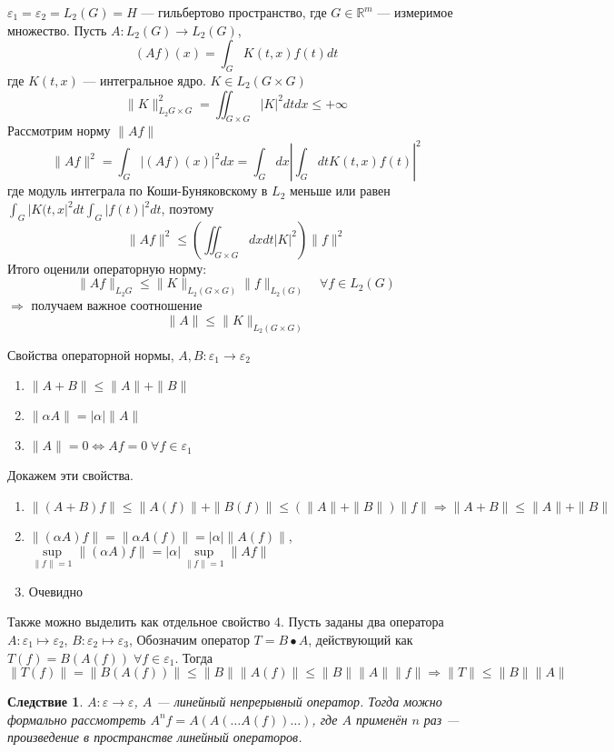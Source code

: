 \documentclass[12pt]{article}
\begin{document}
\begin{Prim}
    $\varepsilon_1 = \varepsilon_2 = L_2(G) = H$ --- гильбертово пространство, где $G \in \mathbb R^m$ --- измеримое множество.
    Пусть $A : L_2(G) \to L_2(G)$, 
    $$
    (Af)(x) = \int_G K(t, x) f(t) dt
    $$
    где $K(t, x)$ --- интегральное ядро.
    $K \in L_2(G \times G) $ 
    $$
    \|K\|^2_{L_2{G \times G}} = \iint_{G \times G} |K|^2 dt dx \le +\infty
    $$
    Рассмотрим норму $\|Af\|$
    $$
    \|Af\|^2 = \int_{G} |(Af)(x)|^2 dx = \int_G dx \left| \int_G dt K(t, x) f(t) \right|^2
    $$
    где модуль интеграла по Коши-Буняковскому в $L_2$ 
    меньше или равен $\int_G |K(t, x|^2 dt \int_G |f(t)|^2 dt$, поэтому
    $$
    \|Af\|^2 \le \left(\iint_{G \times G} dx dt |K|^2 \right)\|f\|^2
    $$
    Итого оценили операторную норму:
    $$
    \|Af\|_{L_2{G}} \le \|K\|_{L_2(G \times G)}\|f\|_{L_2(G)} \quad \forall f \in L_2(G)
    $$
    $\Rightarrow$ получаем важное соотношение
    $$
    \boxed{\|A\| \le \|K\|_{L_2(G \times G)}}
    $$
\end{Prim}

Свойства операторной нормы, $A, B : \varepsilon_1 \to \varepsilon_2$
\begin{enumerate}
    \item{$\|A + B\| \le \|A\| + \|B\|$}
    \item{$\|\alpha A\| = |\alpha| \|A\|$}
    \item{$\|A\| = 0 \Leftrightarrow Af = 0 \; \forall f \in \varepsilon_1$}
\end{enumerate}
Докажем эти свойства.
\begin{enumerate}
    \item{$\|(A + B)f\| \le \|A(f)\| + \|B(f)\| \le (\|A\| + \|B\|)\|f\| \Rightarrow \|A + B\| \le \|A\| + \|B\|$}
    \item{$\|(\alpha A)f\| = \|\alpha A(f)\| = |\alpha| \|A(f)\|$, $\sup \limits_{\|f\| = 1} \|(\alpha A)f\| = |\alpha| \sup \limits_{\|f\| = 1} \|Af\|$}
    \item{Очевидно}
\end{enumerate}
Также можно выделить как отдельное свойство 4.
Пусть заданы два оператора $A : \varepsilon_1 \mapsto \varepsilon_2$, $B : \varepsilon_2 \mapsto \varepsilon_3$, Обозначим оператор $T = B \bullet A$, действующий как $T(f) = B(A(f))\; \forall f \in \varepsilon_1$.
Тогда 
$$
\|T(f)\| = \|B(A(f))\| \le \|B\|\|A(f)\| \le \|B\|\|A\|\|f\| \Rightarrow  \boxed{\|T\| \le \|B\|\|A\|}
$$
\newtheorem{Sled1}{Следствие}
\begin{Sled1}
$A : \varepsilon \to \varepsilon$, $A$ --- линейный непрерывный оператор.
Тогда можно формально рассмотреть $A^n f = A(A(\dots A(f)) \dots )$, где $A$ 
применён  $n$ раз --- произведение в пространстве линейный операторов.
\end{Sled1}
\end{document}
